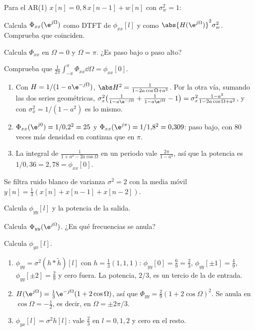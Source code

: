 \documentclass[11pt,a4paper]{scrartcl}
\begin{document}
\begin{ejercicio}[DEP de un AR(1)]
  Para el AR(1) $x[n]=0{,}8\,x[n-1]+w[n]$ con $\sigma_w^2=1$:
  \begin{incisos}[1]
    \item Calcula $\Phi_{xx}(\e^{j\Omega})$ como DTFT de $\phi_{xx}[l]$ y como $\abs{H(\e^{j\Omega})}^2\sigma_w^2$. Comprueba que coinciden.
    \item Calcula $\Phi_{xx}$ en $\Omega=0$ y $\Omega=\pi$. ¿Es paso bajo o paso alto?
    \item Comprueba que $\frac1{2\pi}\int_{-\pi}^{\pi}\Phi_{xx}\dd\Omega=\phi_{xx}[0]$.
  \end{incisos}
\end{ejercicio}
\begin{solucion}
  \begin{enumerate}[label=\alph*)]
    \item Con $H=1/(1-a\e^{-j\Omega})$, $\abs H^2=\frac1{1-2a\cos\Omega+a^2}$. Por la otra vía, sumando las dos series geométricas, $\sigma_x^2\big(\frac1{1-a\e^{-j\Omega}}+\frac1{1-a\e^{j\Omega}}-1\big)=\sigma_x^2\frac{1-a^2}{1-2a\cos\Omega+a^2}$, y con $\sigma_x^2=1/(1-a^2)$ es lo mismo.
    \item $\Phi_{xx}(\e^{j0})=1/0{,}2^2=25$ y $\Phi_{xx}(\e^{j\pi})=1/1{,}8^2=0{,}309$: paso bajo, con 80 veces más densidad en continua que en $\pi$.
    \item La integral de $\frac1{1+a^2-2a\cos\Omega}$ en un periodo vale $\frac{2\pi}{1-a^2}$, así que la potencia es $1/0{,}36=2{,}78=\phi_{xx}[0]$.
  \end{enumerate}
\end{solucion}

\begin{ejercicio}
  Se filtra ruido blanco de varianza $\sigma^2=2$ con la media móvil $y[n]=\frac13(x[n]+x[n-1]+x[n-2])$.
  \begin{incisos}[1]
    \item Calcula $\phi_{yy}[l]$ y la potencia de la salida.
    \item Calcula $\Phi_{yy}(\e^{j\Omega})$. ¿En qué frecuencias se anula?
    \item Calcula $\phi_{yx}[l]$.
  \end{incisos}
\end{ejercicio}
\begin{solucion}
  \begin{enumerate}[label=\alph*)]
    \item $\phi_{yy}=\sigma^2(h*\tilde h)[l]$ con $h=\frac13(1,1,1)$: $\phi_{yy}[0]=\frac69=\frac23$, $\phi_{yy}[\pm1]=\frac49$, $\phi_{yy}[\pm2]=\frac29$ y cero fuera. La potencia, $2/3$, es un tercio de la de entrada.
    \item $H(\e^{j\Omega})=\frac13\e^{-j\Omega}(1+2\cos\Omega)$, así que $\Phi_{yy}=\frac29(1+2\cos\Omega)^2$. Se anula en $\cos\Omega=-\frac12$, es decir, en $\Omega=\pm2\pi/3$.
    \item $\phi_{yx}[l]=\sigma^2h[l]$: vale $\frac23$ en $l=0,1,2$ y cero en el resto.
  \end{enumerate}
\end{solucion}
\end{document}
